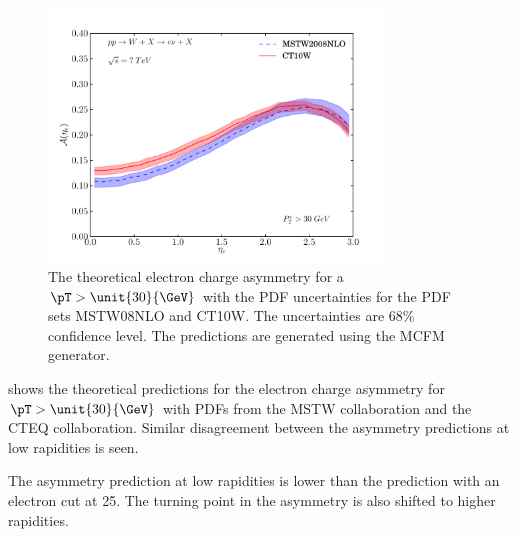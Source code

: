 \begin{figure}[htbp]
  \centering
  \includegraphics[width=0.8\textwidth]{asym-uncert-30}
  \caption[The theoretical electron charge asymmetry for a $\pT>\unit{25}{\GeV}$
with the {PDF} uncertainties.] {The theoretical electron charge
asymmetry\cite{monchenault2011predictions} for a $\pT>\unit{30}{\GeV}$ with the
{PDF} uncertainties for the {PDF} sets MSTW08NLO\cite{martin2009parton} and
CT10W\cite{lai2010vv}. The uncertainties are $68\%$ confidence level. The
predictions are generated using the {MCFM} \cite{campbellmcfm} generator.}
  \label{fig:asym-uncert-30}
\end{figure}

 shows the theoretical predictions for the electron charge asymmetry 
for $\pT>\unit{30}{\GeV}$ with PDFs
from the MSTW collaboration\cite{martin2009parton} and the CTEQ
collaboration\cite{lai2010vv}.  Similar disagreement between the asymmetry
predictions at low rapidities is seen.

The asymmetry prediction at low rapidities is lower than the prediction with an
electron cut at \unit{25}{\GeV}. The turning point in the asymmetry is also
shifted to higher rapidities.


